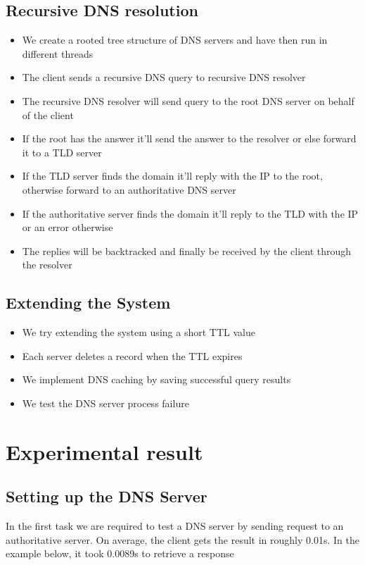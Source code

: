 \documentclass[11pt]{article}
\begin{document}
    \subsection{Recursive DNS resolution}
        \begin{itemize}
            \item We create a rooted tree structure of DNS servers and have then run in different threads
            \item The client sends a recursive DNS query to recursive DNS resolver
            \item The recursive DNS resolver will send query to the root DNS server on behalf of the client
            \item If the root has the answer it'll send the answer to the resolver or else forward it to a TLD server
            \item If the TLD server finds the domain it'll reply with the IP to the root, otherwise forward to an authoritative DNS server
            \item If the authoritative server finds the domain it'll reply to the TLD with the IP or an error otherwise
            \item The replies will be backtracked and finally be received by the client through the resolver
        \end{itemize}
    \subsection{Extending the System}
        \begin{itemize}
            \item We try extending the system using a short TTL value
            \item Each server deletes a record when the TTL expires
            \item We implement DNS caching by saving successful query results
            \item We test the DNS server process failure
        \end{itemize}

\section{Experimental result}
    \subsection{Setting up the DNS Server}
    In the first task we are required to test a DNS server by sending request to an authoritative server. On average, the client gets the result in roughly 0.01s.
    In the example below, it took 0.0089s to retrieve a response
\end{document}
